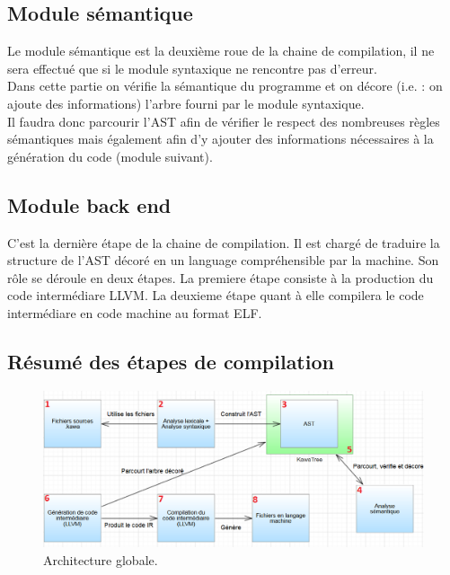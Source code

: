 \documentclass{../res/univ-projet}
\begin{document}
\subsection{Module sémantique}
Le module sémantique est la deuxième roue de la chaine de compilation, il ne sera effectué que si le module syntaxique ne rencontre pas d'erreur.\\

Dans cette partie on vérifie la sémantique du programme et on décore (i.e. : on ajoute des informations) l'arbre fourni par le module syntaxique.\\

Il faudra donc parcourir l'AST afin de vérifier le respect des nombreuses règles sémantiques mais également afin d'y ajouter des informations nécessaires à la génération du code (module suivant).

\subsection{Module back end}
C'est la dernière étape de la chaine de compilation.
Il est chargé de traduire la structure de l'AST décoré en un language compréhensible par la machine.
Son rôle se déroule en deux étapes. La premiere étape consiste à la production du code intermédiare LLVM. La deuxieme étape quant à elle compilera le code intermédiare en code machine au format ELF.


\begin{landscape}

\section{Résumé des étapes de compilation}
\centering

\begin{figure}[h!]
\centering
\includegraphics[scale=0.80]{archi2.png}
\caption[Architecture globale.]{Architecture globale.}
\end{figure}

\end{landscape}
\end{document}
